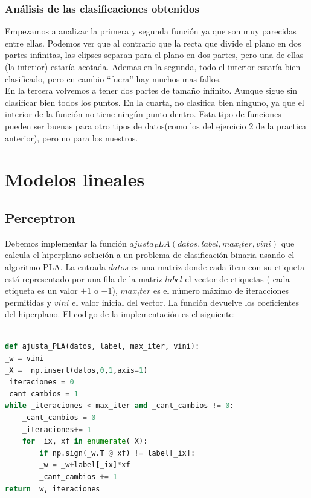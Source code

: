 \documentclass[12pt,a4paper]{article}
\begin{document}
\subsubsection{Análisis de las clasificaciones obtenidos}
Empezamos a analizar la primera y segunda función ya que son muy parecidas entre ellas. Podemos ver que al contrario que la recta que divide el plano en dos partes infinitas, las elipses separan para el plano en dos partes, pero una de ellas (la interior) estaría acotada. Ademas en la segunda, todo el interior estaría bien clasificado, pero en cambio ``fuera'' hay muchos mas fallos.\\
En la tercera volvemos a tener dos partes de tamaño infinito. Aunque sigue sin clasificar bien todos los puntos. En la cuarta, no clasifica bien ninguno, ya que el interior de la función no tiene ningún punto dentro. Esta tipo de funciones pueden ser buenas para otro tipos de datos(como los del ejercicio 2 de la practica anterior), pero no para los nuestros.
\section{Modelos lineales}
\subsection{Perceptron}
Debemos implementar la función $ajusta_PLA(datos,label,max_iter,vini)$ que calcula el hiperplano solución a un problema de clasificación binaria usando el algoritmo PLA. La entrada $datos$ es una matriz donde cada ítem con su etiqueta está representado por una fila de la matriz $label$ el vector de etiquetas ( cada etiqueta es un valor $+1$ o $-1$), $max_iter$ es el número máximo de iteracciones permitidas y $vini$ el valor inicial del vector. La función devuelve los coeficientes del hiperplano. El codigo de la implementación es el siguiente:\\ 
\begin{lstlisting}[language=Python]

def ajusta_PLA(datos, label, max_iter, vini):
_w = vini
_X =  np.insert(datos,0,1,axis=1)
_iteraciones = 0
_cant_cambios = 1
while _iteraciones < max_iter and _cant_cambios != 0:
	_cant_cambios = 0
	_iteraciones+= 1
	for _ix, xf in enumerate(_X):
		if np.sign(_w.T @ xf) != label[_ix]:
		_w = _w+label[_ix]*xf
		_cant_cambios += 1
return _w,_iteraciones
\end{lstlisting}
\end{document}
